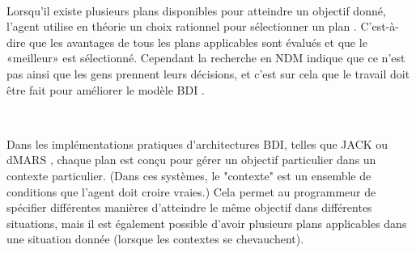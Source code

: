 ~\par
Lorsqu'il existe plusieurs plans disponibles pour atteindre un objectif donné, l'agent utilise en théorie un choix rationnel pour sélectionner un plan \parencite{bratman1988plans}. C'est-à-dire que les avantages de tous les plans applicables sont évalués et que le «meilleur» est sélectionné. Cependant la recherche en NDM indique que ce n'est pas ainsi que les gens prennent leurs décisions, et c'est sur cela que le travail doit être fait pour  améliorer le modèle BDI .

~\par
Dans les implémentations pratiques d'architectures BDI, telles que JACK \parencite{jack} ou dMARS \parencite{dmars1997formal}, chaque plan est conçu pour gérer un objectif particulier dans un contexte particulier. (Dans ces systèmes, le "contexte" est un ensemble de conditions que l'agent doit croire vraies.) Cela permet au programmeur de spécifier différentes manières d'atteindre le même objectif dans différentes situations, mais il est également possible d'avoir plusieurs plans applicables dans une situation donnée (lorsque les contextes se chevauchent).
